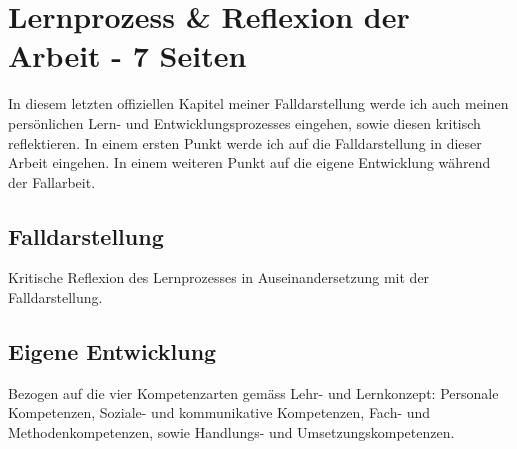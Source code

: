 \section{Lernprozess \& Reflexion der Arbeit - 7 Seiten}\label{Reflexion}
In diesem letzten offiziellen Kapitel meiner Falldarstellung werde ich auch meinen persönlichen Lern- und Entwicklungsprozesses eingehen, sowie diesen kritisch reflektieren. In einem ersten Punkt werde ich auf die Falldarstellung in dieser Arbeit eingehen. In einem weiteren Punkt auf die eigene Entwicklung während der Fallarbeit.

\subsection{Falldarstellung} Kritische Reflexion des Lernprozesses in Auseinandersetzung mit der Falldarstellung.

\subsection{Eigene Entwicklung} Bezogen auf die vier Kompetenzarten gemäss Lehr- und Lernkonzept: Personale Kompetenzen, Soziale- und kommunikative Kompetenzen, Fach- und Methodenkompetenzen, sowie Handlungs- und Umsetzungskompetenzen.
